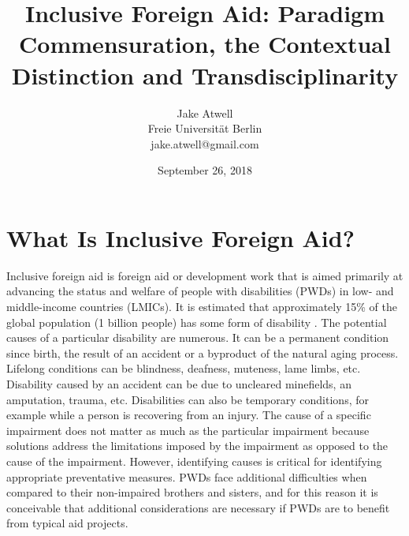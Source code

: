 \documentclass[a4paper]{article}
\begin{document}
\title{Inclusive Foreign Aid: Paradigm Commensuration, the Contextual
Distinction and Transdisciplinarity}
\author{Jake Atwell\\
    Freie Universität Berlin\\
    jake.atwell@gmail.com
}
\date{September 26, 2018}

\maketitle



\newpage


\tableofcontents

\newpage
{} %




\section{What Is Inclusive Foreign Aid?}

Inclusive foreign aid is foreign aid or development work that is aimed
primarily at advancing the status and welfare of people with disabilities
(PWDs) in low- and middle-income countries (LMICs). It is estimated that
approximately 15\% of the global population (1 billion people) has some form
of disability \citep{banks2017poverty}. The potential causes of a particular
disability are numerous. It can be a permanent condition since birth, the
result of an accident or a byproduct of the natural aging process. Lifelong
conditions can be blindness, deafness, muteness, lame limbs, etc. Disability
caused by an accident can be due to uncleared minefields, an amputation,
trauma, etc. Disabilities can also be temporary conditions, for example while
a person is recovering from an injury. The cause of a specific impairment does
not matter as much as the particular impairment because solutions address the
limitations imposed by the impairment as opposed to the cause of the
impairment. However, identifying causes is critical for identifying
appropriate preventative measures. PWDs face additional difficulties when
compared to their non-impaired brothers and sisters, and for this reason it is
conceivable that additional considerations are necessary if PWDs are to
benefit from typical aid projects.
\end{document}
